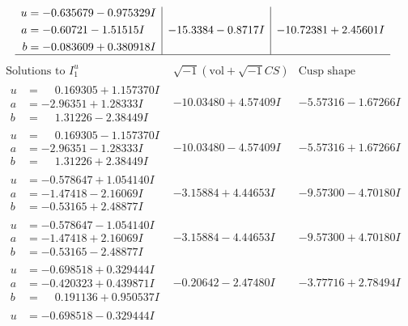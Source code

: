 \documentclass[1p]{elsarticle_modified}
\theoremstyle{definition}
\newcommand{\I}{\sqrt{-1}}
\begin{document}
$$\begin{array}{c|c|c}
\begin{aligned}
u &= -0.635679 - 0.975329 I \\
a &= -0.60721 - 1.51515 I \\
b &= -0.083609 + 0.380918 I\end{aligned}
 & -15.3384 - 0.8717 I & -10.72381 + 2.45601 I\\
 \hline 
 \end{array}$$\newpage$$\begin{array}{c|c|c}  
\text{Solutions to }I^u_{1}& \I (\text{vol} + \sqrt{-1}CS) & \text{Cusp shape}\\
 \hline 
\begin{aligned}
u &= \phantom{-}0.169305 + 1.157370 I \\
a &= -2.96351 + 1.28333 I \\
b &= \phantom{-}1.31226 - 2.38449 I\end{aligned}
 & -10.03480 + 4.57409 I & -5.57316 - 1.67266 I \\ \hline\begin{aligned}
u &= \phantom{-}0.169305 - 1.157370 I \\
a &= -2.96351 - 1.28333 I \\
b &= \phantom{-}1.31226 + 2.38449 I\end{aligned}
 & -10.03480 - 4.57409 I & -5.57316 + 1.67266 I \\ \hline\begin{aligned}
u &= -0.578647 + 1.054140 I \\
a &= -1.47418 - 2.16069 I \\
b &= -0.53165 + 2.48877 I\end{aligned}
 & -3.15884 + 4.44653 I & -9.57300 - 4.70180 I \\ \hline\begin{aligned}
u &= -0.578647 - 1.054140 I \\
a &= -1.47418 + 2.16069 I \\
b &= -0.53165 - 2.48877 I\end{aligned}
 & -3.15884 - 4.44653 I & -9.57300 + 4.70180 I \\ \hline\begin{aligned}
u &= -0.698518 + 0.329444 I \\
a &= -0.420323 + 0.439871 I \\
b &= \phantom{-}0.191136 + 0.950537 I\end{aligned}
 & -0.20642 - 2.47480 I & -3.77716 + 2.78494 I \\ \hline\begin{aligned}
u &= -0.698518 - 0.329444 I \\

\end{aligned}
\end{array}$$
\end{document}
